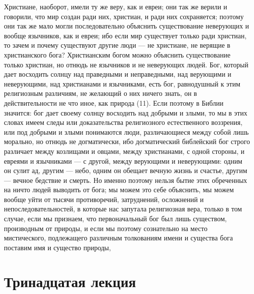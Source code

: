 \documentclass[12pt]{article}
\begin{document}
Христиане, наоборот, имели ту же веру, как и евреи; они так же верили и говорили, что мир создан ради них, христиан, и ради них сохраняется; поэтому они так же мало могли последовательно объяснить существование неверующих и вообще язычников, как и евреи; ибо если мир существует только ради христиан, то зачем и почему существуют другие люди --- не христиане, не верящие в христианского бога? Христианским богом можно объяснить существование только христиан, но отнюдь не язычников и не неверующих людей. Бог, который дает восходить солнцу над праведными и неправедными, над верующими и неверующими, над христианами и язычниками, есть бог, равнодушный к этим религиозным различиям, не желающий о них ничего знать, он в действительности не что иное, как природа (11). Если поэтому в Библии значится: бог дает своему солнцу восходить над добрыми и злыми, то мы в этих словах имеем следы или доказательства религиозного естественного воззрения, или под добрыми и злыми понимаются люди, различающиеся между собой лишь морально, но отнюдь не догматически, ибо догматический библейский бог строго различает между козлищами и овцами, между христианами, с одной стороны, и евреями и язычниками --- с другой, между верующими и неверующими: одним он сулит ад, другим --- небо, одним он обещает вечную жизнь и счастье, другим --- вечное бедствие и смерть. Но именно поэтому нельзя бытие этих обреченных на ничто людей выводить от бога; мы можем это себе объяснить, мы можем вообще уйти от тысячи противоречий, затруднений, осложнений и непоследовательностей, в которые нас запутала религиозная вера, только в том случае, если мы признаем, что первоначальный бог был лишь существом, производным от природы, и если мы поэтому сознательно на место мистического, подлежащего различным толкованиям имени и существа бога поставим имя и существо природы, 

\section*{Тринадцатая лекция}
\end{document}
